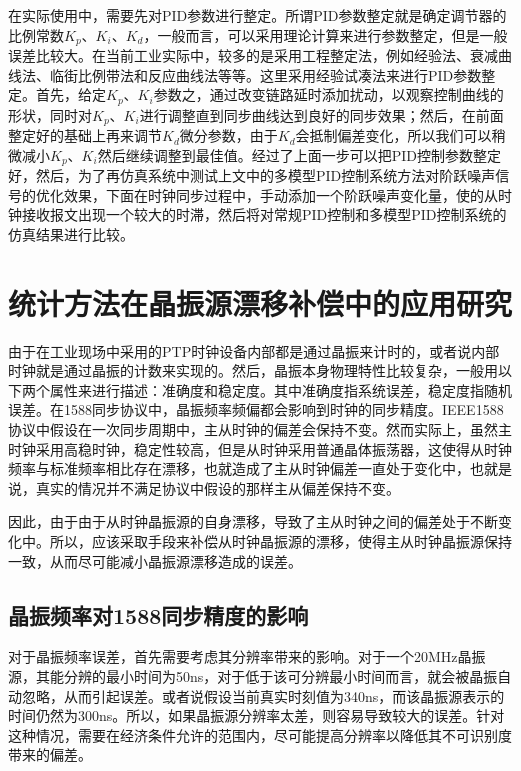 在实际使用中，需要先对PID参数进行整定。所谓PID参数整定就是确定调节器的比例常数$K_{p}$、$K_{i}$、$K_{d}$，一般而言，可以采用理论计算来进行参数整定，但是一般误差比较大。在当前工业实际中，较多的是采用工程整定法，例如经验法、衰减曲线法、临街比例带法和反应曲线法等等。这里采用经验试凑法来进行PID参数整定。首先，给定$K_{p}$、$K_{i}$参数之，通过改变链路延时添加扰动，以观察控制曲线的形状，同时对$K_{p}$、$K_{i}$进行调整直到同步曲线达到良好的同步效果；然后，在前面整定好的基础上再来调节$K_{d}$微分参数，由于$K_{d}$会抵制偏差变化，所以我们可以稍微减小$K_{p}$、$K_{i}$然后继续调整到最佳值。经过了上面一步可以把PID控制参数整定好，然后，为了再仿真系统中测试上文中的多模型PID控制系统方法对阶跃噪声信号的优化效果，下面在时钟同步过程中，手动添加一个阶跃噪声变化量，使的从时钟接收报文出现一个较大的时滞，然后将对常规PID控制和多模型PID控制系统的仿真结果进行比较。

\section{统计方法在晶振源漂移补偿中的应用研究}
由于在工业现场中采用的PTP时钟设备内部都是通过晶振来计时的，或者说内部时钟就是通过晶振的计数来实现的。然后，晶振本身物理特性比较复杂，一般用以下两个属性来进行描述：准确度和稳定度。其中准确度指系统误差，稳定度指随机误差。在1588同步协议中，晶振频率频偏都会影响到时钟的同步精度。IEEE1588协议中假设在一次同步周期中，主从时钟的偏差会保持不变。然而实际上，虽然主时钟采用高稳时钟，稳定性较高，但是从时钟采用普通晶体振荡器，这使得从时钟频率与标准频率相比存在漂移，也就造成了主从时钟偏差一直处于变化中，也就是说，真实的情况并不满足协议中假设的那样主从偏差保持不变。

因此，由于由于从时钟晶振源的自身漂移，导致了主从时钟之间的偏差处于不断变化中。所以，应该采取手段来补偿从时钟晶振源的漂移，使得主从时钟晶振源保持一致，从而尽可能减小晶振源漂移造成的误差。

\subsection{晶振频率对1588同步精度的影响}
对于晶振频率误差，首先需要考虑其分辨率带来的影响。对于一个20MHz晶振源，其能分辨的最小时间为50ns，对于低于该可分辨最小时间而言，就会被晶振自动忽略，从而引起误差。或者说假设当前真实时刻值为340ns，而该晶振源表示的时间仍然为300ns。所以，如果晶振源分辨率太差，则容易导致较大的误差。针对这种情况，需要在经济条件允许的范围内，尽可能提高分辨率以降低其不可识别度带来的偏差。


